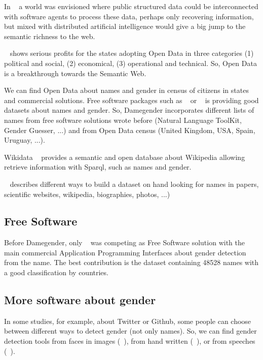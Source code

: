 \documentclass[a4paper]{article}
\begin{document}
In ~\cite{berners2001semantic} a world was envisioned where public
structured data could be interconnected with software agents to
process these data, perhaps only recovering information, but mixed
with distributed artificial intelligence would give a big jump to the
semantic richness to the web.

~\cite{janssen2012benefits} shows serious profits for the states
adopting Open Data in three categories (1) political and social, (2)
economical, (3) operational and technical. So, Open Data is a
breakthrough towards the Semantic Web.

We can find Open Data about names and gender in census of citizens in
states and commercial solutions. Free software packages such as
~\cite{krawetz2006gender} or ~\cite{loper2002nltk} is providing good
datasets about names and gender. So, Damegender incorporates different
lists of names from free software solutions wrote before (Natural
Language ToolKit, Gender Guesser, ...) and from Open Data census
(United Kingdom, USA, Spain, Uruguay, ...). 

Wikidata ~\cite{42240} provides a semantic and open database about
Wikipedia allowing retrieve information with Sparql, such as names and
gender.

~\cite{10.7717/peerj-cs.156} describes different ways to build a
dataset on hand looking for names in papers, scientific websites,
wikipedia, biographies, photos, ...)


\subsection*{Free Software}

Before Damegender, only ~\cite{krawetz2006gender} was competing as
Free Software solution with the main commercial Application
Programming Interfaces about gender detection from the name. The best
contribution is the dataset containing 48528 names with a good
classification by countries.

\subsection*{More software about gender}

In some studies, for example, about Twitter or Github, some people can
choose between different ways to detect gender (not only names). So,
we can find gender detection tools from faces in images
(~\cite{ranjan2017hyperface}), from hand written
(~\cite{liwicki2011automatic}), or from speeches
(~\cite{koppel2002automatically}).
\end{document}
